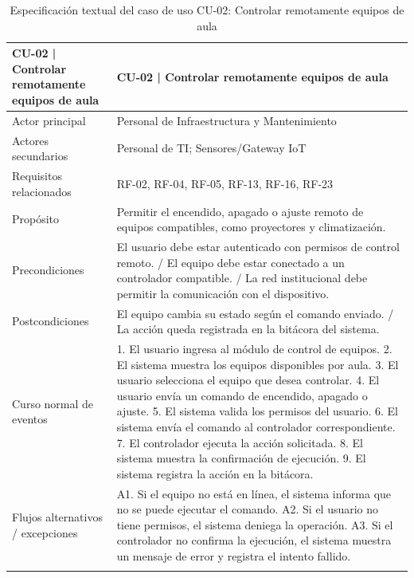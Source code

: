 \begingroup
\small
\begin{longtable}{|P{0.5000}|P{0.5000}|}
\hline
CU-02 | Controlar remotamente equipos de aula & CU-02 | Controlar remotamente equipos de aula \\ \hline
Actor principal & Personal de Infraestructura y Mantenimiento \\ \hline
Actores secundarios & Personal de TI; Sensores/Gateway IoT \\ \hline
Requisitos relacionados & RF-02, RF-04, RF-05, RF-13, RF-16, RF-23 \\ \hline
Propósito & Permitir el encendido, apagado o ajuste remoto de equipos compatibles, como proyectores y climatización. \\ \hline
Precondiciones & El usuario debe estar autenticado con permisos de control remoto. / El equipo debe estar conectado a un controlador compatible. / La red institucional debe permitir la comunicación con el dispositivo. \\ \hline
Postcondiciones & El equipo cambia su estado según el comando enviado. / La acción queda registrada en la bitácora del sistema. \\ \hline
Curso normal de eventos & 1. El usuario ingresa al módulo de control de equipos. 2. El sistema muestra los equipos disponibles por aula. 3. El usuario selecciona el equipo que desea controlar. 4. El usuario envía un comando de encendido, apagado o ajuste. 5. El sistema valida los permisos del usuario. 6. El sistema envía el comando al controlador correspondiente. 7. El controlador ejecuta la acción solicitada. 8. El sistema muestra la confirmación de ejecución. 9. El sistema registra la acción en la bitácora. \\ \hline
Flujos alternativos / excepciones & A1. Si el equipo no está en línea, el sistema informa que no se puede ejecutar el comando. A2. Si el usuario no tiene permisos, el sistema deniega la operación. A3. Si el controlador no confirma la ejecución, el sistema muestra un mensaje de error y registra el intento fallido. \\ \hline
\caption{Especificación textual del caso de uso CU-02: Controlar remotamente equipos de aula}
\end{longtable}
\endgroup

